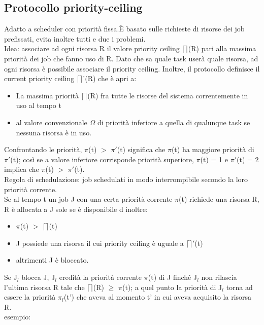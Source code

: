\documentclass[12pt, oneside]{extbook}
\begin{document}
\subsection{Protocollo priority-ceiling}
Adatto a scheduler con priorità fissa.È basato sulle richieste di risorse dei job prefissati, evita inoltre tutti e due i problemi.\\ Idea: associare ad ogni risorsa R il valore priority ceiling $\lceil\rceil$(R) pari alla massima priorità dei job che fanno uso di R. Dato che sa quale task userà quale risorsa, ad ogni risorsa è possibile associare il priority ceiling. Inoltre, il protocollo definisce il current priority ceiling $\lceil\rceil$'(R) che è apri a:
\begin{itemize}
\item La massima priorità $\lceil\rceil$(R) fra tutte le risorse del sistema correntemente in uso al tempo t
\item al valore convenzionale $\Omega$ di priorità  inferiore a quella di qualunque task se nessuna risorsa è in uso.
\end{itemize}
Confrontando le priorità, $\pi$(t) $>$ $\pi'$(t) significa che $\pi$(t) ha maggiore priorità di $\pi'$(t); così se a valore inferiore corrisponde priorità superiore, $\pi$(t) = 1 e $\pi'$(t) = 2 implica che $\pi$(t) $>$ $\pi'$(t).\\ Regola di schedulazione: job schedulati in modo interrompibile secondo la loro priorità corrente.\\ Se al tempo t un job J con una certa priorità corrente $\pi$(t) richiede una risorsa R, R è allocata a J sole se è disponibile d inoltre:
\begin{itemize}
\item $\pi$(t) $>$ $\lceil\rceil$(t)
\item J possiede una risorsa il cui priority ceiling è uguale a $\lceil\rceil'$(t)
\item altrimenti J è bloccato.
\end{itemize}
Se J$_{l}$ blocca J, J$_{l}$ eredità la priorità corrente $\pi$(t) di J finché J$_{l}$ non rilascia l'ultima risorsa R tale che $\lceil\rceil$(R) $\geq$ $\pi$(t); a quel punto la priorità di J$_{l}$ torna ad essere la priorità $\pi_{l}$(t') che aveva al momento t' in cui aveva acquisito la risorsa R.\\ esempio:\\
\end{document}
